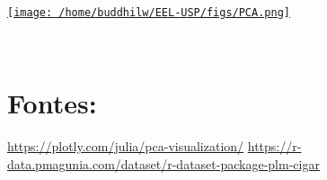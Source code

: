 \documentclass[11pt]{article}
\begin{document}
\href{file:///home/buddhilw/EEL-USP/figs/PCA.png}{\texttt{[image: /home/buddhilw/EEL-USP/figs/PCA.png]}}

🙏🙌 🤲 

\section{Fontes:}
\label{sec:org9c7932c}

\url{https://plotly.com/julia/pca-visualization/}
\url{https://r-data.pmagunia.com/dataset/r-dataset-package-plm-cigar}
\end{document}
